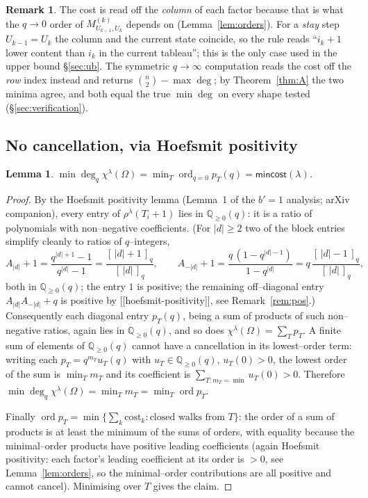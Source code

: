 \documentclass[11pt]{article}
\newtheorem{lemma}[theorem]{Lemma}
\theoremstyle{definition}
\newtheorem{remark}[theorem]{Remark}
\DeclareMathOperator{\ord}{ord}
\begin{document}
\begin{remark}
The cost is read off the \emph{column} of each factor because that is what the
$q\to0$ order of $M^{(k)}_{U_{k-1},U_k}$ depends on (Lemma~\ref{lem:orders}).
For a \emph{stay} step $U_{k-1}=U_k$ the column and the current state coincide,
so the rule reads ``$i_k{+}1$ lower content than $i_k$ in the current tableau'';
this is the only case used in the upper bound \S\ref{sec:ub}. The symmetric
$q\to\infty$ computation reads the cost off the \emph{row} index instead and
returns $\binom n2-\max\deg$; by Theorem~\ref{thm:A} the two minima agree, and
both equal the true $\min\deg$ on every shape tested (\S\ref{sec:verification}).
\end{remark}

\subsection{No cancellation, via Hoefsmit positivity}
\begin{lemma}\label{lem:nocancel}
$\min\deg_q\chi^\lambda(\Omega)=\min_T\ord_{q=0}p_T(q)=\mathsf{mincost}(\lambda)$.
\end{lemma}

\begin{proof}
By the Hoefsmit positivity lemma (Lemma~1 of the $b'=1$ analysis;
arXiv companion), every entry of $\rho^\lambda(T_i+1)$ lies in
$\mathbb Q_{\ge0}(q)$: it is a ratio of polynomials with non--negative
coefficients. (For $|d|\ge2$ two of the block entries simplify cleanly to
ratios of $q$--integers,
\[
A_{|d|}+1=\frac{q^{|d|+1}-1}{q^{|d|}-1}=\frac{[\,|d|+1\,]_q}{[\,|d|\,]_q},
\qquad
A_{-|d|}+1=\frac{q\,(1-q^{|d|-1})}{1-q^{|d|}}=q\,\frac{[\,|d|-1\,]_q}{[\,|d|\,]_q},
\]
both in $\mathbb Q_{\ge0}(q)$; the entry $1$ is positive; the remaining
off--diagonal entry $A_{|d|}A_{-|d|}+q$ is positive by
[[hoefsmit-positivity]], see Remark~\ref{rem:pos}.)
Consequently each diagonal entry $p_T(q)$, being a sum of products of such
non--negative ratios, again lies in $\mathbb Q_{\ge0}(q)$, and so does
$\chi^\lambda(\Omega)=\sum_T p_T$. A finite sum of elements of
$\mathbb Q_{\ge0}(q)$ cannot have a cancellation in its lowest--order term:
writing each $p_T=q^{m_T}u_T(q)$ with $u_T\in\mathbb Q_{\ge0}(q)$,
$u_T(0)>0$, the lowest order of the sum is $\min_T m_T$ and its coefficient is
$\sum_{T:m_T=\min}u_T(0)>0$. Therefore
$\min\deg_q\chi^\lambda(\Omega)=\min_T m_T=\min_T\ord p_T$.

Finally $\ord p_T=\min\{\sum_k\text{cost}_k:\text{closed walks from }T\}$:
the order of a sum of products is at least the minimum of the sums of orders,
with equality because the minimal--order products have positive leading
coefficients (again Hoefsmit positivity: each factor's leading coefficient at
its order is $>0$, see Lemma~\ref{lem:orders}, so the minimal--order
contributions are all positive and cannot cancel). Minimising over $T$ gives
the claim.
\end{proof}
\end{document}
